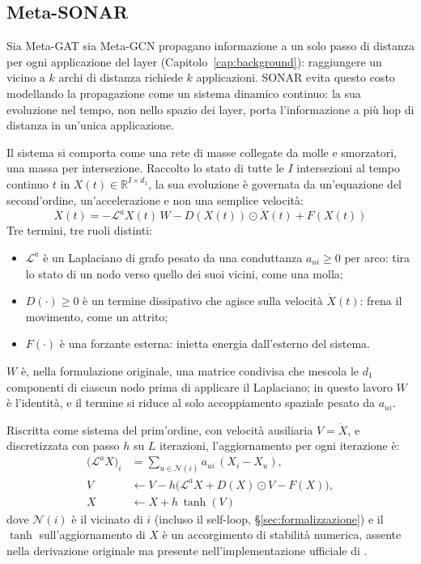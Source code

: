 \subsection{Meta-SONAR}
\label{subsec:meta-sonar}

Sia Meta-GAT sia Meta-GCN propagano informazione a un solo passo di
distanza per ogni applicazione del layer (Capitolo~\ref{cap:background}):
raggiungere un vicino a $k$ archi di distanza richiede $k$ applicazioni.
SONAR \citep{trenta2025sonar} evita questo costo modellando la propagazione
come un sistema dinamico continuo: la sua evoluzione nel tempo, non nello
spazio dei layer, porta l'informazione a più hop di distanza in un'unica
applicazione.

Il sistema si comporta come una rete di masse collegate da molle e
smorzatori, una massa per intersezione. Raccolto lo stato di tutte le $I$
intersezioni al tempo continuo $t$ in $X(t) \in \mathbb{R}^{I \times d_1}$, la sua
evoluzione è governata da un'equazione del second'ordine, un'accelerazione
e non una semplice velocità:
\begin{equation}
  \ddot X(t) = -\mathcal{L}^a X(t)\, W - D(X(t)) \odot \dot X(t) + F(X(t))
  \label{eq:sonar-wave}
\end{equation}
Tre termini, tre ruoli distinti:
\begin{itemize}
  \item $\mathcal{L}^a$ è un Laplaciano di grafo pesato da una conduttanza
        $a_{ui} \geq 0$ per arco: tira lo stato di un nodo verso quello dei suoi
        vicini, come una molla;
  \item $D(\cdot) \geq 0$ è un termine dissipativo che agisce sulla
        velocità $\dot X(t)$: frena il movimento, come un attrito;
  \item $F(\cdot)$ è una forzante esterna: inietta
        energia dall'esterno del sistema.
\end{itemize}
$W$ è, nella formulazione originale, una matrice condivisa che mescola le
$d_1$ componenti di ciascun nodo prima di applicare il Laplaciano; in questo
lavoro $W$ è l'identità, e il termine si riduce al solo accoppiamento
spaziale pesato da $a_{ui}$.

Riscritta come sistema del prim'ordine, con velocità ausiliaria $V=\dot X$,
e discretizzata con passo $h$ su $L$ iterazioni, l'aggiornamento per ogni
iterazione è:
\begin{equation}
  \begin{aligned}
    \big(\mathcal{L}^a X\big)_i & = \sum_{u \in \mathcal{N}(i)} a_{ui}\,(X_i - X_u),              \\
    V                           & \leftarrow V - h\big(\mathcal{L}^a X + D(X)\odot V - F(X)\big), \\
    X                           & \leftarrow X + h\,\tanh(V)
  \end{aligned}
  \label{eq:sonar-discrete}
\end{equation}
dove $\mathcal{N}(i)$ è il vicinato di $i$ (incluso il self-loop,
§\ref{sec:formalizzazione}) e il $\tanh$ sull'aggiornamento di $X$ è un
accorgimento di stabilità numerica, assente nella derivazione originale ma
presente nell'implementazione ufficiale di \citet{trenta2025sonar}.

